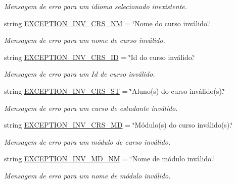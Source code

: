 \begin{DoxyCompactItemize}
\begin{DoxyCompactList}\small\item\em Mensagem de erro para um idioma selecionado inexistente. \end{DoxyCompactList}\item 
string \hyperlink{namespaceELO_1_1lang_1_1pt__br_a932693823770aec33094ffa955e36e2f}{E\-X\-C\-E\-P\-T\-I\-O\-N\-\_\-\-I\-N\-V\-\_\-\-C\-R\-S\-\_\-\-N\-M} = \char`\"{}Nome do curso inválido.\char`\"{}
\begin{DoxyCompactList}\small\item\em Mensagem de erro para um nome de curso inválido. \end{DoxyCompactList}\item 
string \hyperlink{namespaceELO_1_1lang_1_1pt__br_af6bf0e27741cb4f6fdbe17dc9ff26548}{E\-X\-C\-E\-P\-T\-I\-O\-N\-\_\-\-I\-N\-V\-\_\-\-C\-R\-S\-\_\-\-I\-D} = \char`\"{}Id do curso inválido.\char`\"{}
\begin{DoxyCompactList}\small\item\em Mensagem de erro para um Id de curso inválido. \end{DoxyCompactList}\item 
string \hyperlink{namespaceELO_1_1lang_1_1pt__br_afd5c3c43d1a75fbf50d204dc3a4682a7}{E\-X\-C\-E\-P\-T\-I\-O\-N\-\_\-\-I\-N\-V\-\_\-\-C\-R\-S\-\_\-\-S\-T} = \char`\"{}Aluno(s) do curso inválido(s).\char`\"{}
\begin{DoxyCompactList}\small\item\em Mensagem de erro para um curso de estudante inválido. \end{DoxyCompactList}\item 
string \hyperlink{namespaceELO_1_1lang_1_1pt__br_a9c32313b0ed452ee5083fc52b6ba0709}{E\-X\-C\-E\-P\-T\-I\-O\-N\-\_\-\-I\-N\-V\-\_\-\-C\-R\-S\-\_\-\-M\-D} = \char`\"{}Módulo(s) do curso inválido(s).\char`\"{}
\begin{DoxyCompactList}\small\item\em Mensagem de erro para um módulo de curso inválido. \end{DoxyCompactList}\item 
string \hyperlink{namespaceELO_1_1lang_1_1pt__br_a824cd9817e0d7ff1f01237ddcafc4b84}{E\-X\-C\-E\-P\-T\-I\-O\-N\-\_\-\-I\-N\-V\-\_\-\-M\-D\-\_\-\-N\-M} = \char`\"{}Nome de módulo inválido.\char`\"{}
\begin{DoxyCompactList}\small\item\em Mensagem de erro para um nome de módulo inválido. \end{DoxyCompactList}\item 

\end{DoxyCompactItemize}
